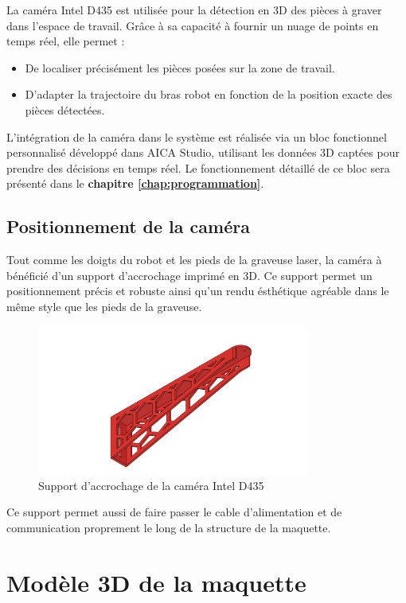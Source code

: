 La caméra Intel D435 \cite{IntelD435}est utilisée pour la détection en 3D des pièces à graver dans l’espace de travail. Grâce à sa capacité à fournir un nuage de points en temps réel, elle permet :
\begin{itemize}
    \item De localiser précisément les pièces posées sur la zone de travail.
    \item D’adapter la trajectoire du bras robot en fonction de la position exacte des pièces détectées.
\end{itemize}

L’intégration de la caméra dans le système est réalisée via un bloc fonctionnel personnalisé développé dans AICA Studio, utilisant les données 3D captées pour prendre des décisions en temps réel. Le fonctionnement détaillé de ce bloc sera présenté dans le \textbf{chapitre \ref{chap:programmation}}.

\subsection{Positionnement de la caméra}

Tout comme les doigts du robot et les pieds de la graveuse laser, la caméra à bénéficié d'un support d'accrochage imprimé en 3D. Ce support permet un positionnement précis et robuste ainsi qu'un rendu ésthétique agréable dans le même style que les pieds de la graveuse.

\begin{figure}[H]
    \centering
    \includegraphics[width=0.8\textwidth]{assets/figures/Porte_camera v6.png}
    \caption{Support d'accrochage de la caméra Intel D435}
    \label{fig:support_camera}
\end{figure}

Ce support permet aussi de faire passer le cable d'alimentation et de communication proprement le long de la structure de la maquette.


\section{Modèle 3D de la maquette}

